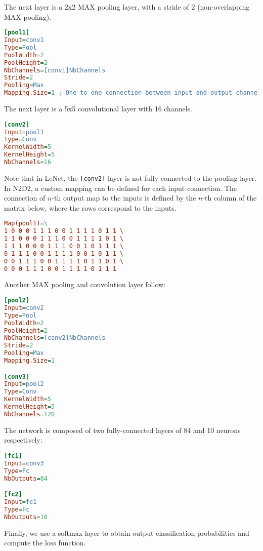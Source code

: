 \documentclass[a4paper,11pt,oneside]{article}
\begin{document}
The next layer is a 2x2 MAX pooling layer, with a stride of 2 (non-overlapping
MAX pooling).

\begin{lstlisting}[language=ini]
[pool1]
Input=conv1
Type=Pool
PoolWidth=2
PoolHeight=2
NbChannels=[conv1]NbChannels
Stride=2
Pooling=Max
Mapping.Size=1 ; One to one connection between input and output channels
\end{lstlisting}

The next layer is a 5x5 convolutional layer with 16 channels.

\begin{lstlisting}[language=ini]
[conv2]
Input=pool1
Type=Conv
KernelWidth=5
KernelHeight=5
NbChannels=16
\end{lstlisting}

Note that in LeNet, the \lstinline![conv2]! layer is not fully connected to the
pooling layer. In N2D2, a custom mapping can be defined for each input
connection. The connection of $n$-th output map to the inputs is defined by the
$n$-th column of the matrix below, where the rows correspond to the inputs.

\begin{lstlisting}[language=ini]
Map(pool1)=\
1 0 0 0 1 1 1 0 0 1 1 1 1 0 1 1 \
1 1 0 0 0 1 1 1 0 0 1 1 1 1 0 1 \
1 1 1 0 0 0 1 1 1 0 0 1 0 1 1 1 \
0 1 1 1 0 0 1 1 1 1 0 0 1 0 1 1 \
0 0 1 1 1 0 0 1 1 1 1 0 1 1 0 1 \
0 0 0 1 1 1 0 0 1 1 1 1 0 1 1 1
\end{lstlisting}

Another MAX pooling and convolution layer follow:

\begin{lstlisting}[language=ini]
[pool2]
Input=conv2
Type=Pool
PoolWidth=2
PoolHeight=2
NbChannels=[conv2]NbChannels
Stride=2
Pooling=Max
Mapping.Size=1

[conv3]
Input=pool2
Type=Conv
KernelWidth=5
KernelHeight=5
NbChannels=120
\end{lstlisting}

The network is composed of two fully-connected layers of 84 and 10 neurons
respectively:

\begin{lstlisting}[language=ini]
[fc1]
Input=conv3
Type=Fc
NbOutputs=84

[fc2]
Input=fc1
Type=Fc
NbOutputs=10
\end{lstlisting}

Finally, we use a softmax layer to obtain output classification probabilities
and compute the loss function.
\end{document}
